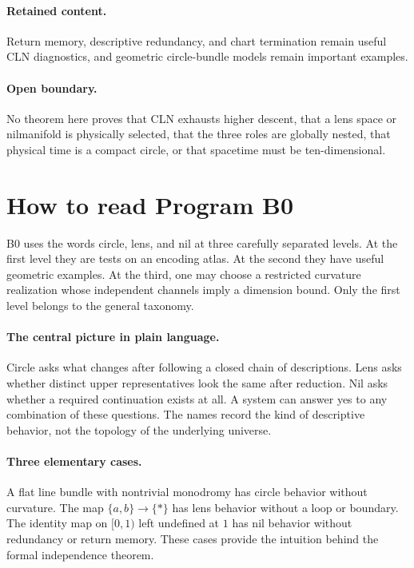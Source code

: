 \documentclass[11pt]{article}
\begin{document}
\paragraph{Retained content.}
Return memory, descriptive redundancy, and chart termination remain useful
CLN diagnostics, and geometric circle-bundle models remain important examples.
\paragraph{Open boundary.}
No theorem here proves that CLN exhausts higher descent, that a lens space or
nilmanifold is physically selected, that the three roles are globally nested,
that physical time is a compact circle, or that spacetime must be
ten-dimensional.

\section*{How to read Program B0}
B0 uses the words circle, lens, and nil at three carefully separated levels.
At the first level they are tests on an encoding atlas.  At the second they
have useful geometric examples.  At the third, one may choose a restricted
curvature realization whose independent channels imply a dimension bound.
Only the first level belongs to the general taxonomy.

\paragraph{The central picture in plain language.}
Circle asks what changes after following a closed chain of descriptions.
Lens asks whether distinct upper representatives look the same after
reduction.  Nil asks whether a required continuation exists at all.  A system
can answer yes to any combination of these questions.  The names record the
kind of descriptive behavior, not the topology of the underlying universe.

\paragraph{Three elementary cases.}
A flat line bundle with nontrivial monodromy has circle behavior without
curvature.  The map $\{a,b\}\to\{\ast\}$ has lens behavior without a loop or
boundary.  The identity map on $[0,1)$ left undefined at $1$ has nil behavior
without redundancy or return memory.  These cases provide the intuition
behind the formal independence theorem.
\end{document}

